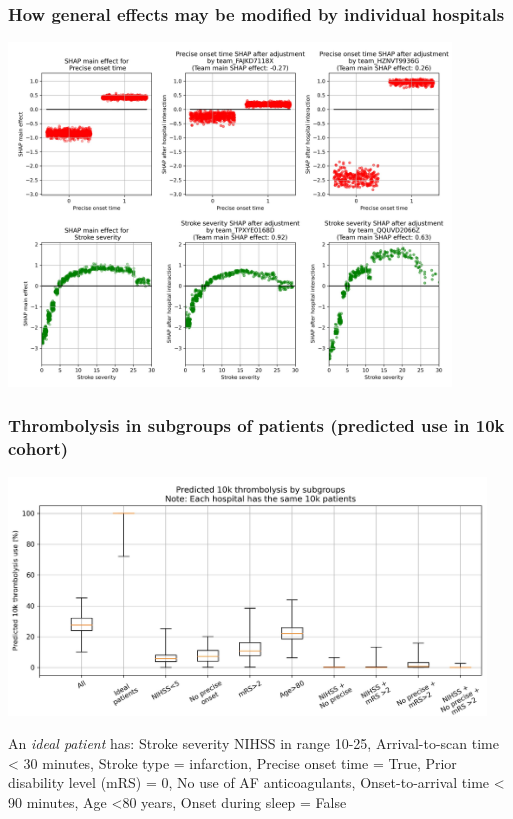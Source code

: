 \documentclass{beamer}
\begin{document}

\begin{frame}
\frametitle{How general effects may be modified by individual hospitals}

\begin{center}
\includegraphics[width=0.88\textwidth]{./images/12aa_two_way_shap_adjustment.jpg}
\end{center}
\end{frame}


\begin{frame}
\frametitle{Thrombolysis in subgroups of patients (predicted use in 10k cohort)}

\begin{center}
\includegraphics[width=0.95\textwidth]{./images/15c_modelled_subgroup_violin.jpg}
\end{center}

\scriptsize An \emph{ideal patient} has: Stroke severity NIHSS in range 10-25, Arrival-to-scan time \textless{} 30 minutes, Stroke type = infarction, Precise onset time = True, Prior disability level (mRS) = 0, No use of AF anticoagulants, Onset-to-arrival time \textless{} 90 minutes, Age \textless{80 years}, Onset during sleep = False
\end{frame}
\end{document}
